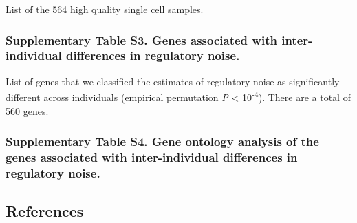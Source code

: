 List of the 564 high quality single cell samples.

\subsubsection{Supplementary Table S3. Genes associated with
inter-individual differences in regulatory
noise.}\label{supplementary-table-s3.-genes-associated-with-inter-individual-differences-in-regulatory-noise.}

List of genes that we classified the estimates of regulatory noise as
significantly different across individuals (empirical permutation
\emph{P} \textless{} 10\textsuperscript{-4}). There are a total of 560
genes.

\subsubsection{Supplementary Table S4. Gene ontology analysis of the
genes associated with inter-individual differences in regulatory
noise.}\label{supplementary-table-s4.-gene-ontology-analysis-of-the-genes-associated-with-inter-individual-differences-in-regulatory-noise.}

\subsection{References}\label{references}
